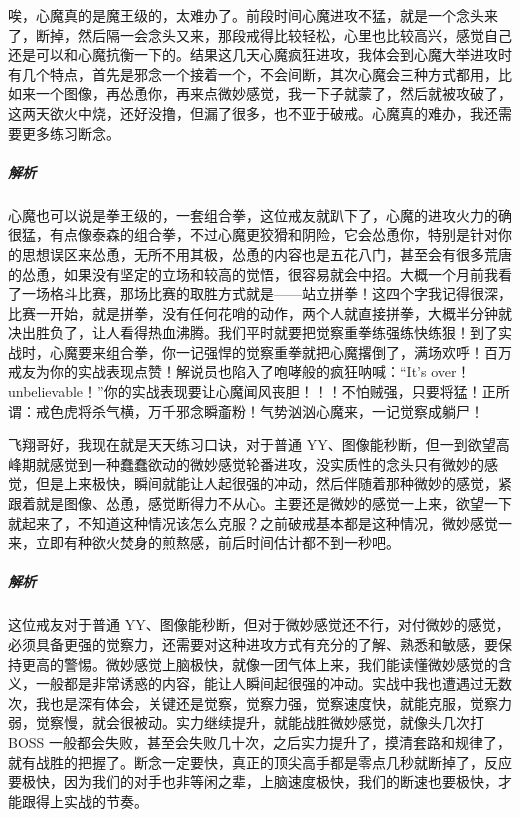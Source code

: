 \begin{case}[如何战胜微妙的感觉]
    唉，心魔真的是魔王级的，太难办了。前段时间心魔进攻不猛，就是一个念头来了，断掉，然后隔一会念头又来，那段戒得比较轻松，心里也比较高兴，感觉自己还是可以和心魔抗衡一下的。结果这几天心魔疯狂进攻，我体会到心魔大举进攻时有几个特点，首先是邪念一个接着一个，不会间断，其次心魔会三种方式都用，比如来一个图像，再怂恿你，再来点微妙感觉，我一下子就蒙了，然后就被攻破了，这两天欲火中烧，还好没撸，但漏了很多，也不亚于破戒。心魔真的难办，我还需要更多练习断念。
    \subparagraph{解析} 心魔也可以说是拳王级的，一套组合拳，这位戒友就趴下了，心魔的进攻火力的确很猛，有点像泰森的组合拳，不过心魔更狡猾和阴险，它会怂恿你，特别是针对你的思想误区来怂恿，无所不用其极，怂恿的内容也是五花八门，甚至会有很多荒唐的怂恿，如果没有坚定的立场和较高的觉悟，很容易就会中招。大概一个月前我看了一场格斗比赛，那场比赛的取胜方式就是——站立拼拳！这四个字我记得很深，比赛一开始，就是拼拳，没有任何花哨的动作，两个人就直接拼拳，大概半分钟就决出胜负了，让人看得热血沸腾。我们平时就要把觉察重拳练强练快练狠！到了实战时，心魔要来组合拳，你一记强悍的觉察重拳就把心魔撂倒了，满场欢呼！百万戒友为你的实战表现点赞！解说员也陷入了咆哮般的疯狂呐喊：“It's over！unbelievable！”你的实战表现要让心魔闻风丧胆！！！不怕贼强，只要将猛！正所谓：戒色虎将杀气横，万千邪念瞬齑粉！气势汹汹心魔来，一记觉察成躺尸！
\end{case}

\begin{case}[如何战胜微妙的感觉]
    飞翔哥好，我现在就是天天练习口诀，对于普通 YY、图像能秒断，但一到欲望高峰期就感觉到一种蠢蠢欲动的微妙感觉轮番进攻，没实质性的念头只有微妙的感觉，但是上来极快，瞬间就能让人起很强的冲动，然后伴随着那种微妙的感觉，紧跟着就是图像、怂恿，感觉断得力不从心。主要还是微妙的感觉一上来，欲望一下就起来了，不知道这种情况该怎么克服？之前破戒基本都是这种情况，微妙感觉一来，立即有种欲火焚身的煎熬感，前后时间估计都不到一秒吧。
    \subparagraph{解析} 这位戒友对于普通 YY、图像能秒断，但对于微妙感觉还不行，对付微妙的感觉，必须具备更强的觉察力，还需要对这种进攻方式有充分的了解、熟悉和敏感，要保持更高的警惕。微妙感觉上脑极快，就像一团气体上来，我们能读懂微妙感觉的含义，一般都是非常诱惑的内容，能让人瞬间起很强的冲动。实战中我也遭遇过无数次，我也是深有体会，关键还是觉察，觉察力强，觉察速度快，就能克服，觉察力弱，觉察慢，就会很被动。实力继续提升，就能战胜微妙感觉，就像头几次打 BOSS 一般都会失败，甚至会失败几十次，之后实力提升了，摸清套路和规律了，就有战胜的把握了。断念一定要快，真正的顶尖高手都是零点几秒就断掉了，反应要极快，因为我们的对手也非等闲之辈，上脑速度极快，我们的断速也要极快，才能跟得上实战的节奏。
\end{case}

